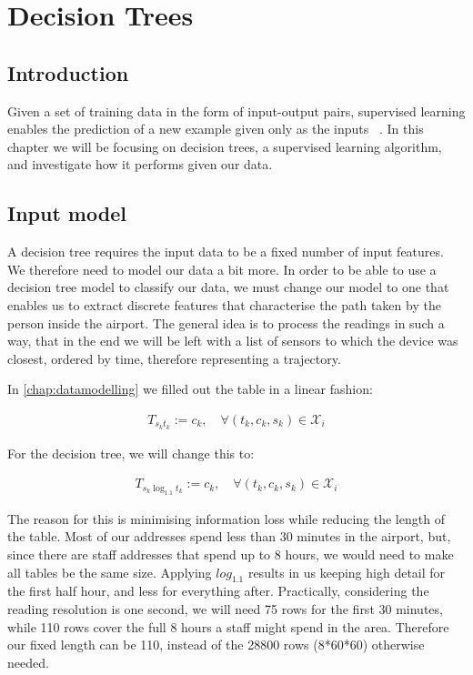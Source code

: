 \chapter{Decision Trees}\label{chap:dectrees}

\section{Introduction}

Given a set of training data in the form of input-output pairs, supervised learning enables the prediction of a new example given only as the inputs ~\cite{aimp17}. In this chapter we will be focusing on decision trees, a supervised learning algorithm, and investigate how it performs given our data.

\section{Input model}
\par
A decision tree requires the input data to be a fixed number of input features. We therefore need to model our data a bit more. In order to be able to use a decision tree model to classify our data, we must change our model to one that enables us to extract discrete features that characterise the path taken by the person inside the airport. The general idea is to process the readings in such a way, that in the end we will be left with a list of sensors to which the device was closest, ordered by time, therefore representing a trajectory.\\

\par
In \ref{chap:datamodelling} we filled out the table in a linear fashion:

\begin{align*}
    T_{s_kt_k} := c_k, \quad \forall (t_k, c_k, s_k) \in \mathcal{X}_i 
\end{align*}

For the decision tree, we will change this to:

\begin{align*}
    T_{s_k\log_{1.1} t_k} := c_k, \quad \forall (t_k, c_k, s_k) \in \mathcal{X}_i 
\end{align*}
    
\par
The reason for this is minimising information loss while reducing the length of the table. Most of our addresses spend less than 30 minutes in the airport, but, since there are staff addresses that spend up to 8 hours, we would need to make all tables be the same size. Applying $log_{1.1}$ results in us keeping high detail for the first half hour, and less for everything after. Practically, considering the reading resolution is one second, we will need 75 rows for the first 30 minutes, while 110 rows cover the full 8 hours a staff might spend in the area. Therefore our fixed length can be 110, instead of the 28800 rows (8*60*60) otherwise needed.\\


